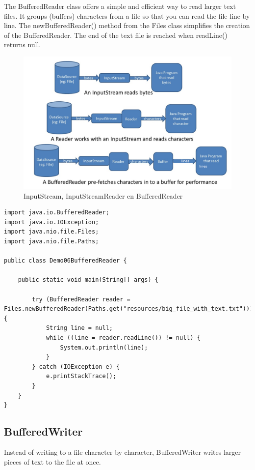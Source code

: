 The BufferedReader class offers a simple and efficient way to read larger text files. It groups (buffers) characters from a file so that you can read the file line by line. The newBufferedReader() method from the Files class simplifies the creation of the BufferedReader. The end of the text file is reached when readLine() returns null.

\begin{figure}[H]
  \includegraphics[width=\linewidth]{images/h8/stream_reader.png}
  \caption{InputStream, InputStreamReader en BufferedReader}
  \label{fig:paths}
\end{figure}

\begin{lstlisting}
import java.io.BufferedReader;
import java.io.IOException;
import java.nio.file.Files;
import java.nio.file.Paths;

public class Demo06BufferedReader {

	public static void main(String[] args) {

		try (BufferedReader reader =  Files.newBufferedReader(Paths.get("resources/big_file_with_text.txt"))) {
			String line = null;
			while ((line = reader.readLine()) != null) {
				System.out.println(line);
			}
		} catch (IOException e) {
			e.printStackTrace();
		}
	}
}
\end{lstlisting}

\subsection{BufferedWriter}


Instead of writing to a file character by character, BufferedWriter writes larger pieces of text to the file at once.

